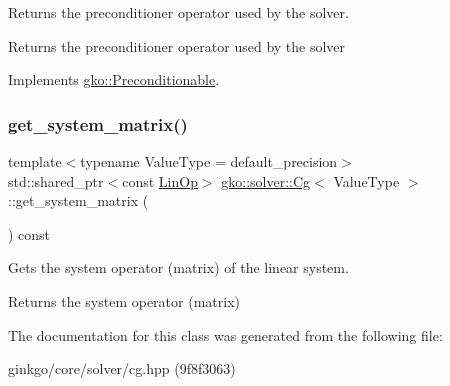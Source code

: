 Returns the preconditioner operator used by the solver. 

\begin{DoxyReturn}{Returns}
the preconditioner operator used by the solver 
\end{DoxyReturn}


Implements \hyperlink{classgko_1_1Preconditionable_ad9545089aef0dfc83bc7a74e5bf1d748}{gko\+::\+Preconditionable}.

\mbox{\label{classgko_1_1solver_1_1Cg_a09d50a99fdc668316757ee253386ad2a}} 
\subsubsection{\texorpdfstring{get\+\_\+system\+\_\+matrix()}{get\_system\_matrix()}}
{\footnotesize\ttfamily template$<$typename Value\+Type  = default\+\_\+precision$>$ \\
std\+::shared\+\_\+ptr$<$const \hyperlink{classgko_1_1LinOp}{Lin\+Op}$>$ \hyperlink{classgko_1_1solver_1_1Cg}{gko\+::solver\+::\+Cg}$<$ Value\+Type $>$\+::get\+\_\+system\+\_\+matrix (\begin{DoxyParamCaption}{ }\end{DoxyParamCaption}) const}



Gets the system operator (matrix) of the linear system. 

\begin{DoxyReturn}{Returns}
the system operator (matrix) 
\end{DoxyReturn}


The documentation for this class was generated from the following file\+:\begin{DoxyCompactItemize}
\item 
ginkgo/core/solver/cg.\+hpp (9f8f3063)\end{DoxyCompactItemize}
